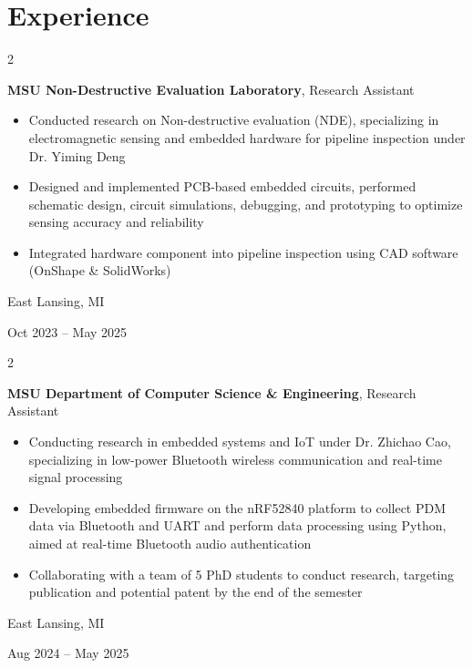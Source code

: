 \documentclass[10pt, letterpaper]{article}
\newenvironment{highlights}{
    \begin{itemize}[
        topsep=0.10 cm,
        parsep=0.10 cm,
        partopsep=0pt,
        itemsep=0pt,
        leftmargin=0.4 cm + 10pt
    ]
}{
    \end{itemize}
} %
\newenvironment{twocolentry}[2][]{
    \onecolentry
    \def\secondColumn{#2}
    \setcolumnwidth{\fill, 4.5 cm}
    \begin{paracol}{2}
}{
    \switchcolumn \raggedleft \secondColumn
    \end{paracol}
    \endonecolentry
} %
\begin{document}
    
    \section{Experience}



        
        \begin{twocolentry}{
            East Lansing, MI

        Oct 2023 – May 2025
        }
            \textbf{MSU Non-Destructive Evaluation Laboratory}, Research Assistant
            \begin{highlights}
                \item Conducted research on Non-destructive evaluation (NDE), specializing in electromagnetic sensing and embedded hardware for pipeline inspection under Dr. Yiming Deng
                \item Designed and implemented PCB-based embedded circuits, performed schematic design, circuit simulations, debugging, and prototyping to optimize sensing accuracy and reliability
                \item Integrated hardware component into pipeline inspection using CAD software (OnShape \& SolidWorks)
            \end{highlights}
        \end{twocolentry}


        \vspace{0.2 cm}

        \begin{twocolentry}{
            East Lansing, MI

        Aug 2024 – May 2025
        }
            \textbf{MSU Department of Computer Science \& Engineering}, Research Assistant
            \begin{highlights}
                \item Conducting research in embedded systems and IoT under Dr. Zhichao Cao, specializing in low-power Bluetooth wireless communication and real-time signal processing
                \item Developing embedded firmware on the nRF52840 platform to collect PDM data via Bluetooth and UART and perform data processing using Python, aimed at real-time Bluetooth audio authentication
                \item Collaborating with a team of 5 PhD students to conduct research, targeting publication and potential patent by the end of the semester
            \end{highlights}
        \end{twocolentry}
\end{document}
